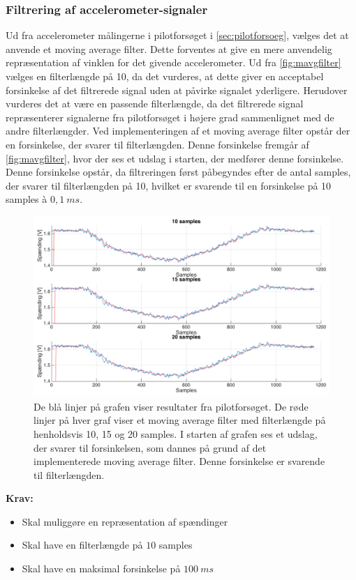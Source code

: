 \subsubsection{Filtrering af accelerometer-signaler} \label{sec:mavg_krav}
Ud fra accelerometer målingerne i pilotforsøget i \autoref{sec:pilotforsoeg}, vælges det at anvende et moving average filter. Dette forventes at give en mere anvendelig repræsentation af vinklen for det givende accelerometer. Ud fra \autoref{fig:mavgfilter} vælges en filterlængde på 10, da det vurderes, at dette giver en acceptabel forsinkelse af det filtrerede signal uden at påvirke signalet yderligere. Herudover vurderes det at være en passende filterlængde, da det filtrerede signal repræsenterer signalerne fra pilotforsøget i højere grad sammenlignet med de andre filterlængder. Ved implementeringen af et moving average filter opstår der en forsinkelse, der svarer til filterlængden. Denne forsinkelse fremgår af \autoref{fig:mavgfilter}, hvor der ses et udslag i starten, der medfører denne forsinkelse. Denne forsinkelse opstår, da filtreringen først påbegyndes efter de antal samples, der svarer til filterlængden på 10, hvilket er svarende til en forsinkelse på 10 samples à $0,1~ms$. 

\begin{figure} [H]
\centering
\includegraphics[width=1\textwidth]{figures/problemloesning/mavgfilter_matlab} 
\caption{De blå linjer på grafen viser resultater fra pilotforsøget. De røde linjer på hver graf viser et moving average filter med filterlængde på henholdsvis 10, 15 og 20 samples. I starten af grafen ses et udslag, der svarer til forsinkelsen, som dannes på grund af det implementerede moving average filter. Denne forsinkelse er svarende til filterlængden.}
\label{fig:mavgfilter}
\end{figure}

\vspace{3mm}

\textbf{Krav:}
\begin{itemize}
\item Skal muliggøre en repræsentation af spændinger 
\item Skal have en filterlængde på $10$ samples
\item Skal have en maksimal forsinkelse på $100~ms$
\end{itemize}